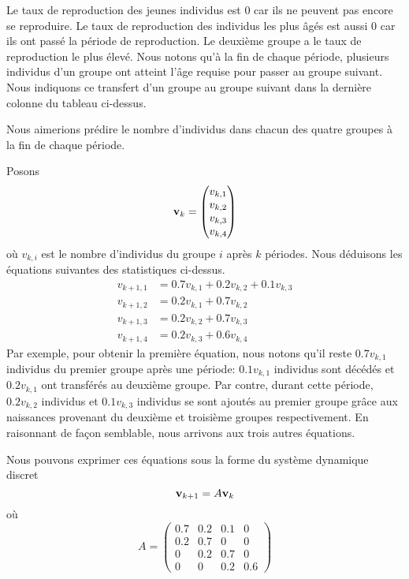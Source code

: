 {\begin{egg}
Le taux de reproduction des jeunes individus est $0$ car ils ne
peuvent pas encore se reproduire.  Le taux de reproduction des
individus les plus âgés est aussi $0$ car ils ont passé la période de
reproduction.  Le deuxième groupe a le taux de reproduction le plus
élevé.  Nous notons qu'à la fin de chaque période, plusieurs individus
d'un groupe ont atteint l'âge requise pour passer au groupe suivant.
Nous indiquons ce transfert d'un groupe au groupe suivant dans la dernière
colonne du tableau ci-dessus.

Nous aimerions prédire le nombre d'individus dans chacun des quatre
groupes à la fin de chaque période.

Posons
\[
\mathbf{v}_k = \begin{pmatrix} v_{k,1} \\ v_{k,2} \\ v_{k,3} \\ v_{k,4}
\end{pmatrix}
\]
où $v_{k,i}$ est le nombre d'individus du groupe $i$ après $k$
périodes.  Nous déduisons les équations suivantes des statistiques
ci-dessus.
\begin{align*}
v_{k+1,1} &= 0.7 v_{k,1} + 0.2 v_{k,2} + 0.1 v_{k,3}  \\
v_{k+1,2} &= 0.2 v_{k,1} + 0.7 v_{k,2}  \\
v_{k+1,3} &= 0.2 v_{k,2} + 0.7 v_{k,3} \\
v_{k+1,4} &= 0.2 v_{k,3} + 0.6 v_{k,4}
\end{align*}
Par exemple, pour obtenir la première équation, nous notons qu'il reste
$0.7 v_{k,1}$ individus du premier groupe après une période:
$0.1 v_{k,1}$ individus sont décédés et $0.2 v_{k,1}$ ont transférés au
deuxième groupe.   Par contre, durant cette période, $0.2 v_{k,2}$
individus et $0.1 v_{k,3}$ individus se sont ajoutés au premier groupe
grâce aux naissances provenant du deuxième et troisième groupes
respectivement.  En raisonnant de façon semblable, nous arrivons aux trois
autres équations.

Nous pouvons exprimer ces équations sous la forme du système dynamique
discret
\begin{equation}\label{nDDDS}
\mathbf{v}_{k+1} = A \mathbf{v}_k
\end{equation}
où
\[
A = \begin{pmatrix}
0.7 & 0.2 & 0.1 & 0 \\
0.2 & 0.7 & 0 & 0 \\
0 & 0.2 & 0.7 & 0 \\
0 & 0 & 0.2 & 0.6
\end{pmatrix}
\]


\end{egg}}
